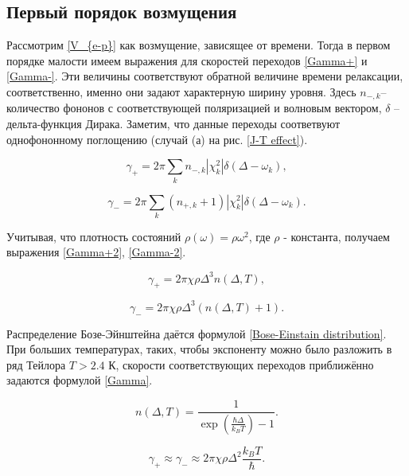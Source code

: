 \subsection{Первый порядок возмущения}
Рассмотрим \ref{V_{e-p}} как возмущение, зависящее от времени. Тогда в первом порядке
малости имеем выражения для скоростей переходов \ref{Gamma+} и \ref{Gamma-}. 
Эти величины соответствуют обратной величине времени релаксации, соответственно,
именно они задают характерную ширину уровня. Здесь $n_{-, k}$-- количество 
фононов с соответствующей поляризацией и волновым вектором, $\delta$ -- дельта-функция
Дирака. Заметим, что данные переходы соответвуют однофононному поглощению (случай (а)
на рис. \ref{J-T effect}).

\begin{equation}
    \label{Gamma+}
    \gamma_+ = 2\pi \sum_{k}n_{-, k}|\chi_k^2|\delta (\Delta - \omega_k),
\end{equation}

\begin{equation}
    \label{Gamma-}
    \gamma_- = 2\pi \sum_{k}(n_{+, k}+1)|\chi_k^2|\delta (\Delta - \omega_k).
\end{equation}

Учитывая, что плотность состояний $\rho(\omega) = \rho \omega^2$, где $\rho$ - константа,
получаем выражения \ref{Gamma+2}, \ref{Gamma-2}. 

\begin{equation}
    \label{Gamma+2}
    \gamma_+ = 2\pi \chi \rho \Delta^3 n(\Delta, T),
\end{equation}

\begin{equation}
    \label{Gamma-2}
    \gamma_- = 2\pi \chi \rho \Delta^3 \left( n(\Delta, T)+1 \right).
\end{equation}

Распределение Бозе-Эйнштейна даётся формулой \ref{Bose-Einstain distribution}.
При больших температурах, таких, чтобы экспоненту можно было разложить в ряд Тейлора 
$T > 2.4 \text{ К}$, скорости соответствующих переходов приближённо задаются 
формулой \ref{Gamma}.

\begin{equation}
    \label{Bose-Einstain distribution}
    n(\Delta, T) = \frac{1}{\exp(\frac{\hbar \Delta}{k_{B}T})-1}.
\end{equation}

\begin{equation}
    \label{Gamma}
    \gamma_{+} \approx \gamma_{-} \approx 2\pi \chi \rho \Delta^2 \frac{k_{B}T}{\hbar}.
\end{equation}


